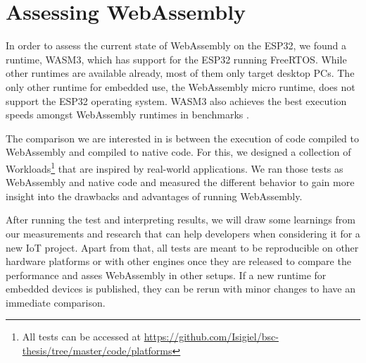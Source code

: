 \section*{Assessing WebAssembly}

In order to assess the current state of WebAssembly on the ESP32, we found a runtime, WASM3, which has support for the ESP32 running FreeRTOS. While other runtimes are available already, most of them only target desktop PCs. The only other runtime for embedded use, the WebAssembly micro runtime, does not support the ESP32 operating system. WASM3 also achieves the best execution speeds amongst WebAssembly runtimes in benchmarks \autocite{shymanskyy_wasm3_2020}.

The comparison we are interested in is between the execution of code compiled to WebAssembly and compiled to native code. For this, we designed a collection of Workloads\footnote{All tests can be accessed at \url{https://github.com/Isigiel/bsc-thesis/tree/master/code/platforms}} that are inspired by real-world applications. We ran those tests as WebAssembly and native code and measured the different behavior to gain more insight into the drawbacks and advantages of running WebAssembly.

After running the test and interpreting results, we will draw some learnings from our measurements and research that can help developers when considering it for a new IoT project. Apart from that, all tests are meant to be reproducible on other hardware platforms or with other engines once they are released to compare the performance and asses WebAssembly in other setups. If a new runtime for embedded devices is published, they can be rerun with minor changes to have an immediate comparison.
